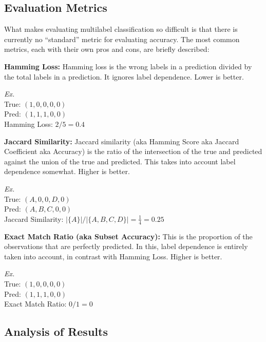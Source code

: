 \documentclass{article}
\begin{document}
    \subsection{Evaluation Metrics}
    \indent 
    
    What makes evaluating multilabel classification so difficult is that there is currently no ``standard'' metric for evaluating accuracy. The most common metrics, each with their own pros and cons, are briefly described:
    
        \textbf{Hamming Loss:} Hamming loss is the wrong labels in a prediction divided by the total labels in a prediction. It ignores label dependence. Lower is better.
        
        \textit{Ex.}\\
        \indent True: $(1, 0, 0, 0, 0)$\\
        \indent Pred: $(1, 1, 1, 0, 0)$\\
        \indent Hamming Loss: $2 / 5 = 0.4$
        
        \textbf{Jaccard Similarity:} Jaccard similarity (aka Hamming Score aka Jaccard Coefficient aka Accuracy) is the ratio of the intersection of the true and predicted against the union of the true and predicted. This takes into account label dependence somewhat. Higher is better.
        
        \textit{Ex.}\\
        \indent True: $(A, 0, 0, D, 0)$\\
        \indent Pred: $(A, B, C, 0, 0)$\\
        \indent Jaccard Similarity: $|\{A\}| / |\{A, B, C, D\}| = \frac{1}{4} = 0.25$
        
        \textbf{Exact Match Ratio (aka Subset Accuracy):} This is the proportion of the observations that are perfectly predicted. In this, label dependence is entirely taken into account, in contrast with Hamming Loss. Higher is better.
        
        \textit{Ex.}\\
        \indent True: $(1, 0, 0, 0, 0)$\\
        \indent Pred: $(1, 1, 1, 0, 0)$\\
        \indent Exact Match Ratio: $0 / 1 = 0$
    
    \subsection{Analysis of Results}
    \indent
    
\end{document}
